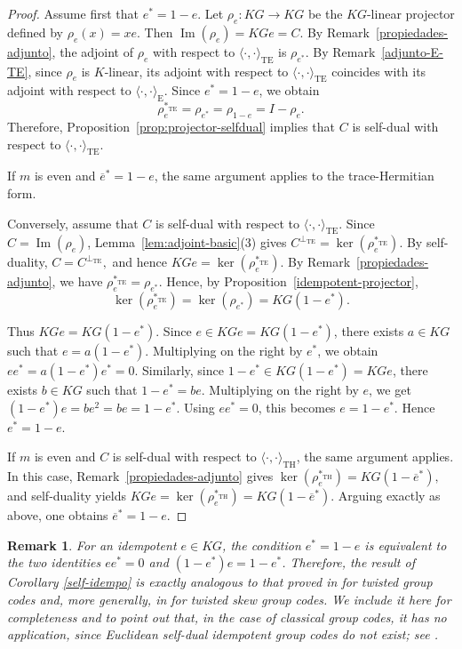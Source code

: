 \documentclass[11pt]{article}
\newtheorem{remark}[theorem]{Remark}
\begin{document}
\begin{proof}
Assume first that $e^\ast=1-e$. Let $\rho_e:KG\longrightarrow KG$ be the $KG$-linear projector defined by $\rho_e(x)=xe$. Then $\operatorname{Im}(\rho_e)=KGe=C$. By Remark~\ref{propiedades-adjunto}, the adjoint of $\rho_e$ with respect to $\langle\cdot,\cdot\rangle_{\mathrm{TE}}$ is $\rho_{e^\ast}$. By Remark~\ref{adjunto-E-TE}, since $\rho_e$ is $K$-linear, its adjoint with respect to $\langle\cdot,\cdot\rangle_{\mathrm{TE}}$ coincides with its adjoint with respect to $\langle\cdot,\cdot\rangle_{\mathrm{E}}$. Since $e^\ast=1-e$, we obtain
$$
\rho_e^{\ast_{\mathrm{TE}}}=\rho_{e^\ast}=\rho_{1-e}=I-\rho_e.
$$
Therefore, Proposition~\ref{prop:projector-selfdual} implies that $C$ is self-dual with respect to $\langle\cdot,\cdot\rangle_{\mathrm{TE}}$.

If $m$ is even and $\overline e^\ast=1-e$, the same argument applies to the trace-Hermitian form.

Conversely, assume that $C$ is self-dual with respect to $\langle\cdot,\cdot\rangle_{\mathrm{TE}}$. Since $C=\operatorname{Im}(\rho_e)$, Lemma~\ref{lem:adjoint-basic}(3) gives
$
C^{\perp_{\mathrm{TE}}}=\ker(\rho_e^{\ast_{\mathrm{TE}}}).
$
By self-duality,
$
C=C^{\perp_{\mathrm{TE}}},
$
and hence
$
KGe=\ker(\rho_e^{\ast_{\mathrm{TE}}}).
$
By Remark~\ref{propiedades-adjunto}, we have
$
\rho_e^{\ast_{\mathrm{TE}}}=\rho_{e^\ast}.
$
Hence, by Proposition~\ref{idempotent-projector},
$$
\ker(\rho_e^{\ast_{\mathrm{TE}}})=\ker(\rho_{e^\ast})=KG(1-e^\ast).
$$

Thus
$
KGe=KG(1-e^\ast).
$
Since $e\in KGe=KG(1-e^\ast)$, there exists $a\in KG$ such that
$
e=a(1-e^\ast).
$
Multiplying on the right by $e^\ast$, we obtain
$
ee^\ast=a(1-e^\ast)e^\ast=0.
$
Similarly, since $1-e^\ast\in KG(1-e^\ast)=KGe$, there exists $b\in KG$ such that
$
1-e^\ast=be.
$
Multiplying on the right by $e$, we get
$
(1-e^\ast)e=be^2=be=1-e^\ast.
$
Using $ee^\ast=0$, this becomes
$
e=1-e^\ast.
$
Hence
$
e^\ast=1-e.
$

If $m$ is even and $C$ is self-dual with respect to $\langle\cdot,\cdot\rangle_{\mathrm{TH}}$, the same argument applies. In this case, Remark~\ref{propiedades-adjunto} gives
$
\ker(\rho_e^{\ast_{\mathrm{TH}}})=KG(1-\overline e^\ast),
$
and self-duality yields
$
KGe=\ker(\rho_e^{\ast_{\mathrm{TH}}})=KG(1-\overline e^\ast).
$
Arguing exactly as above, one obtains
$
\overline e^\ast=1-e.
$
\end{proof}

\begin{remark} For an idempotent $e\in KG$, the condition $e^\ast=1-e$ is equivalent to the two identities $ee^\ast=0$ and $(1-e^\ast)e=1-e^\ast$. Therefore, the result of  Corollary \ref{self-idempo} is exactly analogous to that proved in \cite{DeLaCruzWillems2021} for twisted group codes and, more generally, in \cite{BBW24} for twisted skew group codes. We include it here for completeness and to point out that, in the case of classical group codes, it has no application, since Euclidean self-dual idempotent group codes do not exist; see \cite{Willems2002}.
\end{remark}
\end{document}
